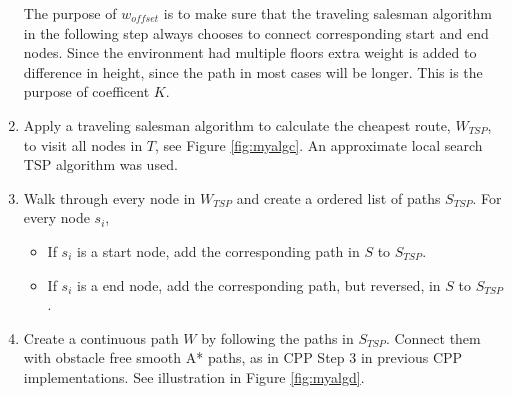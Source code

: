 \begin{enumerate}
     The purpose of $w_{offset}$ is to make sure that the traveling salesman algorithm in the following step always chooses to connect corresponding start and end nodes. Since the environment had multiple floors extra weight is added to difference in height, since the path in most cases will be longer. This is the purpose of coefficent $K$.
    \item Apply a traveling salesman algorithm to calculate the cheapest route, $W_{TSP}$, to visit all nodes in $T$, see Figure \ref{fig:myalgc}. An approximate local search TSP algorithm \cite{python-tsp} was used.
    \item Walk through every node in $W_{TSP}$ and create a ordered list of paths $S_{TSP}$. For every node $s_i$,
    \begin{itemize}
        \item If $s_i$ is a start node, add the corresponding path in $S$ to $S_{TSP}$.
        \item If $s_i$ is a end node, add the corresponding path, but reversed, in $S$ to $S_{TSP}$.
    \end{itemize}
    \item Create a continuous path $W$ by following the paths in $S_{TSP}$. Connect them with obstacle free smooth A* paths, as in CPP Step 3 in previous CPP implementations. See illustration in Figure \ref{fig:myalgd}.
\end{enumerate}

